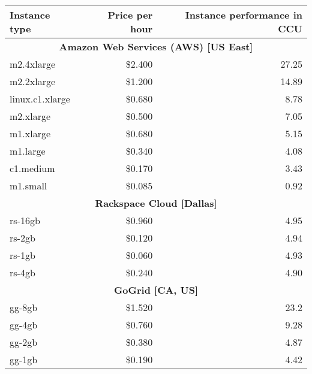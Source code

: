 {\begin{table}
  \centering
  \begin{tabular}{| l | r | r |}
    \hline
    \textbf{Instance type} & \textbf{Price per hour} & \textbf{Instance performance in CCU} \\ \hline
    \multicolumn{3}{|c|}{\textbf{Amazon Web Services (AWS) [US East]}}       \\ \hline
    m2.4xlarge        & \$2.400   & 27.25                                    \\ \hline
    m2.2xlarge        & \$1.200   & 14.89                                    \\ \hline
    linux.c1.xlarge   & \$0.680   & 8.78                                     \\ \hline
    m2.xlarge         & \$0.500   & 7.05                                     \\ \hline
    m1.xlarge         & \$0.680   & 5.15                                     \\ \hline
    m1.large          & \$0.340   & 4.08                                     \\ \hline
    c1.medium         & \$0.170   & 3.43                                     \\ \hline
    m1.small          & \$0.085   & 0.92                                     \\ \hline
    \multicolumn{3}{|c|}{\textbf{Rackspace Cloud [Dallas]}}                  \\ \hline
    rs-16gb           & \$0.960   & 4.95                                     \\ \hline
    rs-2gb            & \$0.120   & 4.94                                     \\ \hline  
    rs-1gb            & \$0.060   & 4.93                                     \\ \hline
    rs-4gb            & \$0.240   & 4.90                                     \\ \hline
    \multicolumn{3}{|c|}{\textbf{GoGrid [CA, US]}}                           \\ \hline
    gg-8gb            & \$1.520   & 23.2                                     \\ \hline
    gg-4gb            & \$0.760   & 9.28                                     \\ \hline
    gg-2gb            & \$0.380   & 4.87                                     \\ \hline
    gg-1gb            & \$0.190   & 4.42                                     \\ \hline

\end{tabular}
\end{table}}

